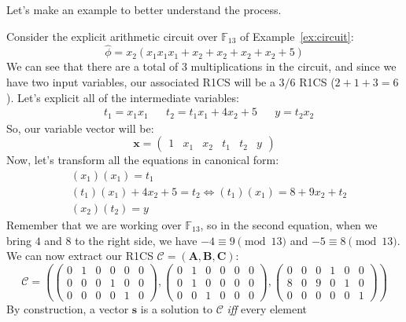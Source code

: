 \noindent Let's make an example to better understand the process.
\begin{example}\label{ex:r1cs}
	Consider the explicit arithmetic circuit over \(\mathbb{F}_{13}\) of Example~\ref{ex:circuit}:
	\[\widehat{\phi} = x_2\left(x_1x_1x_1 + x_2 + x_2 + x_2 + x_2 + 5\right)\]
	We can see that there are a total of 3 multiplications in the circuit, and since we have two input
	variables, our associated R1CS will be a \(3/6\) R1CS (\(2+1+3 = 6\)).
	Let's explicit all of the intermediate variables:
	\begin{align*}
		 & t_1 = x_1x_1 &  & t_2 = t_1x_1 + 4x_2 + 5 &  & y = t_2x_2
	\end{align*}
	So, our variable vector will be:
	\[\bm{x} = \begin{pmatrix}1 & x_1 & x_2 & t_1 & t_2 & y\end{pmatrix}\]
	Now, let's transform all the equations in canonical form:
	\begin{align*}
		 & \left(x_1\right)\left(x_1\right) = t_1                   \\
		 & {\left(t_1\right)\left(x_1\right) + 4x_2 + 5 = t_2} \iff
		{\left(t_1\right)\left(x_1\right) = 8 + 9x_2 + t_2}         \\
		 & \left(x_2\right)\left(t_2\right) = y
	\end{align*}
	Remember that we are working over \(\mathbb{F}_{13}\), so in the second equation, when we bring
	\(4\) and \(8\) to the right side, we have \(-4 \equiv 9 \pmod{13}\) and \(-5 \equiv 8 \pmod{13}\).
	We can now extract our R1CS \(\mathcal{C} = \left(\bm{A}, \bm{B}, \bm{C}\right)\):
	\[
		\mathcal{C} =
		\left(
		\begin{pmatrix}
				0 & 1 & 0 & 0 & 0 & 0 \\
				0 & 0 & 0 & 1 & 0 & 0 \\
				0 & 0 & 0 & 0 & 1 & 0
			\end{pmatrix},
		\begin{pmatrix}
				0 & 1 & 0 & 0 & 0 & 0 \\
				0 & 1 & 0 & 0 & 0 & 0 \\
				0 & 0 & 1 & 0 & 0 & 0
			\end{pmatrix},
		\begin{pmatrix}
				0 & 0 & 0 & 1 & 0 & 0 \\
				8 & 0 & 9 & 0 & 1 & 0 \\
				0 & 0 & 0 & 0 & 0 & 1
			\end{pmatrix}
		\right)
	\]
	By construction, a vector \(\bm{s}\) is a solution to \(\mathcal{C}\) \emph{iff} every element

\end{example}
